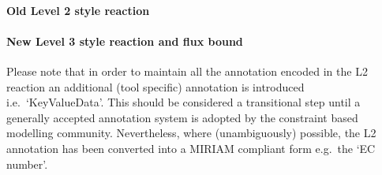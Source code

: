 \paragraph{Old \SBML Level 2 style reaction}
\newpage
\paragraph{New \SBML Level 3 style reaction and flux bound}
Please note that in order to maintain all the annotation encoded in the \SBML L2 reaction  an additional (tool specific) annotation is introduced i.e.~`KeyValueData'. This should be considered a transitional step until a generally accepted annotation system is adopted by the constraint based modelling community. Nevertheless, where (unambiguously) possible, the L2 annotation has been converted into a MIRIAM compliant form e.g.~the `EC number'.


